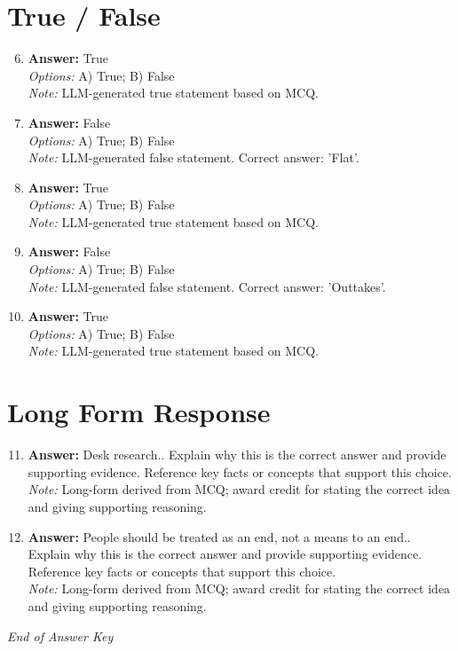 \documentclass[12pt]{article}
\begin{document}
\section*{True / False}
\begin{enumerate}[label=\arabic*.]
\setcounter{enumi}{5}
\item \textbf{Answer:} True
\\ \textit{Options:} A) True; B) False
\\ \textit{Note:} LLM-generated true statement based on MCQ.
\item \textbf{Answer:} False
\\ \textit{Options:} A) True; B) False
\\ \textit{Note:} LLM-generated false statement. Correct answer: 'Flat'.
\item \textbf{Answer:} True
\\ \textit{Options:} A) True; B) False
\\ \textit{Note:} LLM-generated true statement based on MCQ.
\item \textbf{Answer:} False
\\ \textit{Options:} A) True; B) False
\\ \textit{Note:} LLM-generated false statement. Correct answer: 'Outtakes'.
\item \textbf{Answer:} True
\\ \textit{Options:} A) True; B) False
\\ \textit{Note:} LLM-generated true statement based on MCQ.
\end{enumerate}

\section*{Long Form Response}
\begin{enumerate}[label=\arabic*.]
\setcounter{enumi}{10}
\item \textbf{Answer:} Desk research.. Explain why this is the correct answer and provide supporting evidence. Reference key facts or concepts that support this choice.
\\ \textit{Note:} Long-form derived from MCQ; award credit for stating the correct idea and giving supporting reasoning.
\item \textbf{Answer:} People should be treated as an end, not a means to an end.. Explain why this is the correct answer and provide supporting evidence. Reference key facts or concepts that support this choice.
\\ \textit{Note:} Long-form derived from MCQ; award credit for stating the correct idea and giving supporting reasoning.
\end{enumerate}

\vfill
\noindent\textit{End of Answer Key}
\end{document}
